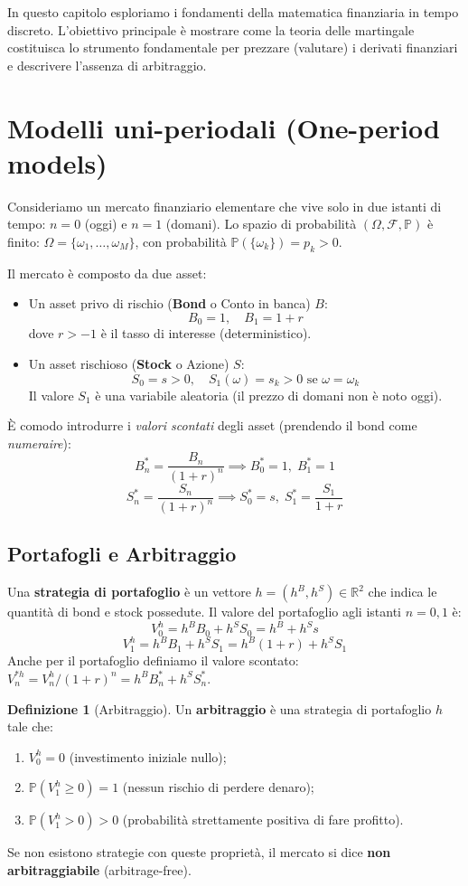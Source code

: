 \documentclass[11pt, a4paper]{report}
\theoremstyle{plain}
\theoremstyle{definition}
\newtheorem{definition}[theorem]{Definizione}
\theoremstyle{remark}
\newcommand{\PP}{\mathbb{P}}
\newcommand{\R}{\mathbb{R}}
\newcommand{\1}{\mathbf{1}}
\begin{document}
In questo capitolo esploriamo i fondamenti della matematica finanziaria in tempo discreto. L'obiettivo principale è mostrare come la teoria delle martingale costituisca lo strumento fondamentale per prezzare (valutare) i derivati finanziari e descrivere l'assenza di arbitraggio.

\section{Modelli uni-periodali (One-period models)}

Consideriamo un mercato finanziario elementare che vive solo in due istanti di tempo: $n=0$ (oggi) e $n=1$ (domani). Lo spazio di probabilità $(\Omega, \mathcal{F}, \PP)$ è finito: $\Omega = \{\omega_1, \dots, \omega_M\}$, con probabilità $\PP(\{\omega_k\}) = p_k > 0$.

Il mercato è composto da due asset:
\begin{itemize}
    \item Un asset privo di rischio (\textbf{Bond} o Conto in banca) $B$:
    \[ B_0 = 1, \quad B_1 = 1 + r \]
    dove $r > -1$ è il tasso di interesse (deterministico).
    \item Un asset rischioso (\textbf{Stock} o Azione) $S$:
    \[ S_0 = s > 0, \quad S_1(\omega) = s_k > 0 \text{ se } \omega = \omega_k \]
    Il valore $S_1$ è una variabile aleatoria (il prezzo di domani non è noto oggi).
\end{itemize}

È comodo introdurre i \emph{valori scontati} degli asset (prendendo il bond come \textit{numeraire}):
\[ B^*_n = \frac{B_n}{(1+r)^n} \implies B^*_0 = 1, \; B^*_1 = 1 \]
\[ S^*_n = \frac{S_n}{(1+r)^n} \implies S^*_0 = s, \; S^*_1 = \frac{S_1}{1+r} \]

\subsection{Portafogli e Arbitraggio}

Una \textbf{strategia di portafoglio} è un vettore $h = (h^B, h^S) \in \R^2$ che indica le quantità di bond e stock possedute. Il valore del portafoglio agli istanti $n=0, 1$ è:
\[ V_0^h = h^B B_0 + h^S S_0 = h^B + h^S s \]
\[ V_1^h = h^B B_1 + h^S S_1 = h^B (1+r) + h^S S_1 \]
Anche per il portafoglio definiamo il valore scontato: $V_n^{*h} = V_n^h / (1+r)^n = h^B B^*_n + h^S S^*_n$.

\begin{definition}[Arbitraggio]
Un \textbf{arbitraggio} è una strategia di portafoglio $h$ tale che:
\begin{enumerate}
    \item $V_0^h = 0$ (investimento iniziale nullo);
    \item $\PP(V_1^h \ge 0) = 1$ (nessun rischio di perdere denaro);
    \item $\PP(V_1^h > 0) > 0$ (probabilità strettamente positiva di fare profitto).
\end{enumerate}
Se non esistono strategie con queste proprietà, il mercato si dice \textbf{non arbitraggiabile} (arbitrage-free).
\end{definition}
\end{document}
